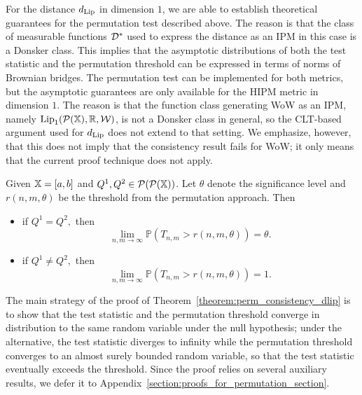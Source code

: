 For the distance $d_{\mathrm{Lip}}$ in dimension $1$, we are able to establish theoretical guarantees for the permutation test described above. The reason is that the class of measurable functions $\mathcal{D}^*$ used to express the distance as an IPM in this case is a Donsker class. This implies that the asymptotic distributions of both the test statistic and the permutation threshold can be expressed in terms of norms of Brownian bridges.
The permutation test can be implemented for both metrics, but the asymptotic guarantees are only available for the HIPM metric in dimension $1$. The reason is that the function class generating WoW as an IPM, namely $\mathrm{Lip}_1(\mathcal{P}(\mathbb{X}), \mathbb{R}, \mathcal{W})$, is not a Donsker class in general, so the CLT-based argument used for $d_{\mathrm{Lip}}$ does not extend to that setting. We emphasize, however, that this does not imply that the consistency result fails for WoW; it only means that the current proof technique does not apply.
\begin{theorem}
\label{theorem:perm_consistency_dlip}
Given $\mathbb{X} = [a,b]$ and $Q^1, Q^2 \in \mathcal{P}(\mathcal{P}(\mathbb{X}))$. Let $\theta$ denote the significance level and $r(n,m, \theta)$ be the threshold from the permutation approach. Then
\begin{itemize}
    \item if $Q^1 = Q^2,$ then $$ \lim_{n,m\to \infty} \mathbb{P}\left(T_{n,m}>r(n,m, \theta)\right) = \theta.$$
    \item if $Q^1 \neq Q^2,$ then $$ \lim_{n,m\to \infty} \mathbb{P}\left(T_{n,m} > r(n,m,\theta) \right) = 1.$$
\end{itemize}
\end{theorem}
The main strategy of the proof of Theorem~\ref{theorem:perm_consistency_dlip} is to show that the test statistic and the permutation threshold converge in distribution to the same random variable under the null hypothesis; under the alternative, the test statistic diverges to infinity while the permutation threshold converges to an almost surely bounded random variable, so that the test statistic eventually exceeds the threshold. Since the proof relies on several auxiliary results, we defer it to Appendix~\ref{section:proofs_for_permutation_section}.


























